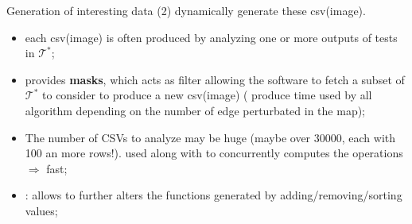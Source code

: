 \begin{frame}{Generation of interesting data (2)}
     dynamically generate these csv(image).

    \begin{itemize}
        \item each csv(image) is often produced by analyzing one or more outputs of tests in $\mathcal{T}^{*}$;
        \item {} provides \textbf{masks}, which acts as filter allowing the software to fetch a subset of $\mathcal{T}^{*}$ to consider to produce a new csv(image) (\eg{} produce time used by all algorithm depending on the number of edge perturbated in the map);
        \item The number of CSVs to analyze may be huge (maybe over 30000, each with 100 an more rows!).  used  along with  to concurrently computes the operations $\Rightarrow$ fast;
        \item {}: allows to further alters the functions generated by adding/removing/sorting values;
    \end{itemize}
\end{frame}


